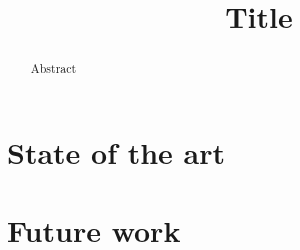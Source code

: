 \documentclass[12pt,a4paper,twocolumn]{article}
\title{Title}
\begin{document}
\maketitle

\begin{abstract}
  Abstract
\end{abstract}

\tableofcontents

\section{State of the art}
\label{sec:state-art}

\section{Future work}
\label{sec:future-work}



\end{document}
